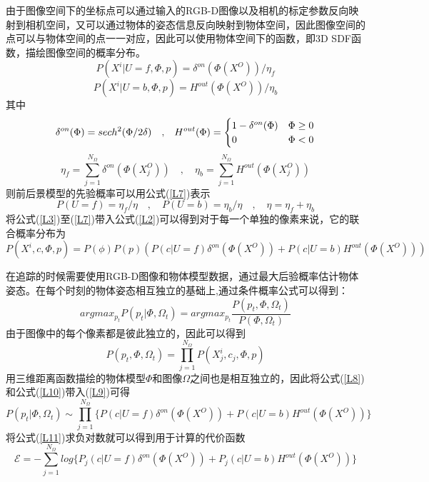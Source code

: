 由于图像空间下的坐标点可以通过输入的RGB-D图像以及相机的标定参数反向映射到相机空间，又可以通过物体的姿态信息反向映射到物体空间，因此图像空间的点可以与物体空间的点一一对应，因此可以使用物体空间下的函数，即3D SDF函数，描绘图像空间的概率分布。
\begin{equation}
 P(X^i|U=f, \Phi, p)=\delta^{on}(\Phi(X^O))/\eta_f\label{L3}
\end{equation}
\begin{equation}
 P(X^i|U=b, \Phi, p)=H^{out}(\Phi(X^O))/\eta_b\label{L4}
\end{equation}
其中
\begin{equation} \label{L5}
 \delta^{on}(\Phi)=sech^2(\Phi/2\delta) \quad\mathrm{,}\quad
 H^{out}(\Phi)=
 \begin{cases}
    1-\delta^{on}(\Phi) &\Phi\geq0\cr
    0 &\Phi<0
\end{cases}
\end{equation}
\begin{equation}\label{L6}
 \eta_f=\sum_{j=1}^{N_\Omega}\delta^{on}(\Phi(X_j^O))
\quad\mathrm{,}\quad
 \eta_b=\sum_{j=1}^{N_\Omega}H^{out}(\Phi(X_j^O))
\end{equation}
则前后景模型的先验概率可以用公式(\ref{L7})表示
\begin{equation}\label{L7}
 P(U=f)=\eta_f/\eta \quad\mathrm{,}\quad  P(U=b)=\eta_b/\eta \quad\mathrm{,}\quad  \eta=\eta_f+\eta_b
\end{equation}
将公式(\ref{L3})至(\ref{L7})带入公式(\ref{L2})可以得到对于每一个单独的像素来说，它的联合概率分布为
\begin{equation}\label{L8}
 P(X^i, c, \Phi, p) = P(\phi)P(p)(P(c|U=f)\delta^{on}(\Phi(X^O)) + P(c|U=b)H^{out}(\Phi(X^O)))
\end{equation}

在追踪的时候需要使用RGB-D图像和物体模型数据，通过最大后验概率估计物体姿态。在每个时刻的物体姿态相互独立的基础上,通过条件概率公式可以得到：
\begin{equation}\label{L9}
argmax_{p_t}P(p_t|\Phi,\Omega_t) = argmax_{p_t}\frac{P(p_t,\Phi,\Omega_t)}{P(\Phi,\Omega_t)}
\end{equation}
由于图像中的每个像素都是彼此独立的，因此可以得到
\begin{equation}\label{L10}
P(p_t,\Phi,\Omega_t)=\prod_{j=1}^{N_\Omega}P(X_j^i, c_j, \Phi, p)
\end{equation}
用三维距离函数描绘的物体模型$\Phi$和图像$\Omega$之间也是相互独立的，因此将公式(\ref{L8})和公式(\ref{L10})带入(\ref{L9})可得
\begin{equation}\label{L11}
P(p_t|\Phi,\Omega_t) \sim \prod_{j=1}^{N_\Omega}\Big\{P(c|U=f)\delta^{on}(\Phi(X^O)) + P(c|U=b)H^{out}(\Phi(X^O))\Big\}
\end{equation}
将公式(\ref{L11})求负对数就可以得到用于计算的代价函数
\begin{equation}\label{L12}
\mathscr{E} = -\sum_{j=1}^{N_\Omega}log\Big\{P_j(c|U=f)\delta^{on}(\Phi(X^O)) + P_j(c|U=b)H^{out}(\Phi(X^O))\Big\}
\end{equation}

